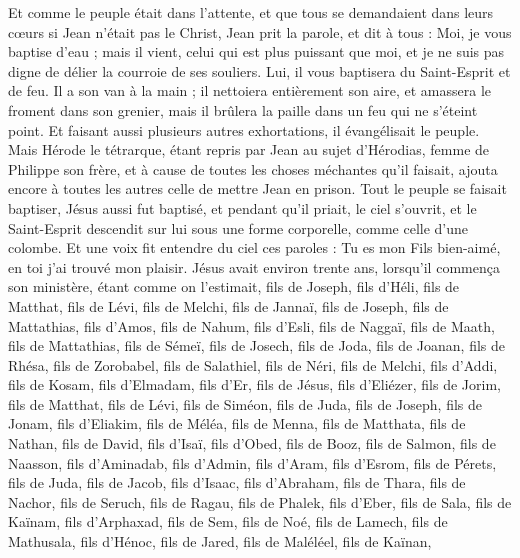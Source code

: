 \begin{multicols}{2}
Et comme le peuple était dans l'attente, et que tous se demandaient dans leurs cœurs si Jean n'était pas le Christ,
Jean prit la parole, et dit à tous : Moi, je vous baptise d'eau ; mais il vient, celui qui est plus puissant que moi, et je ne suis pas digne de délier la courroie de ses souliers. Lui, il vous baptisera du Saint-Esprit et de feu.
Il a son van à la main ; il nettoiera entièrement son aire, et amassera le froment dans son grenier, mais il brûlera la paille dans un feu qui ne s'éteint point.
Et faisant aussi plusieurs autres exhortations, il évangélisait le peuple.
Mais Hérode le tétrarque, étant repris par Jean au sujet d'Hérodias, femme de Philippe son frère, et à cause de toutes les choses méchantes qu'il faisait,
ajouta encore à toutes les autres celle de mettre Jean en prison.
Tout le peuple se faisait baptiser, Jésus aussi fut baptisé, et pendant qu'il priait, le ciel s'ouvrit,
et le Saint-Esprit descendit sur lui sous une forme corporelle, comme celle d'une colombe. Et une voix fit entendre du ciel ces paroles : Tu es mon Fils bien-aimé, en toi j'ai trouvé mon plaisir.
Jésus avait environ trente ans, lorsqu'il commença son ministère, étant comme on l'estimait, fils de Joseph, fils d'Héli,
fils de Matthat, fils de Lévi, fils de Melchi, fils de Jannaï, fils de Joseph,
fils de Mattathias, fils d'Amos, fils de Nahum, fils d'Esli, fils de Naggaï,
fils de Maath, fils de Mattathias, fils de Sémeï, fils de Josech, fils de Joda,
fils de Joanan, fils de Rhésa, fils de Zorobabel, fils de Salathiel, fils de Néri,
fils de Melchi, fils d'Addi, fils de Kosam, fils d'Elmadam, fils d'Er,
fils de Jésus, fils d'Eliézer, fils de Jorim, fils de Matthat, fils de Lévi,
fils de Siméon, fils de Juda, fils de Joseph, fils de Jonam, fils d'Eliakim,
fils de Méléa, fils de Menna, fils de Matthata, fils de Nathan, fils de David,
fils d'Isaï, fils d'Obed, fils de Booz, fils de Salmon, fils de Naasson,
fils d'Aminadab, fils d’Admin, fils d'Aram, fils d'Esrom, fils de Pérets, fils de Juda,
fils de Jacob, fils d'Isaac, fils d'Abraham, fils de Thara, fils de Nachor,
fils de Seruch, fils de Ragau, fils de Phalek, fils d'Eber, fils de Sala,
fils de Kaïnam, fils d’Arphaxad, fils de Sem, fils de Noé, fils de Lamech,
fils de Mathusala, fils d'Hénoc, fils de Jared, fils de Maléléel, fils de Kaïnan,

\end{multicols}
